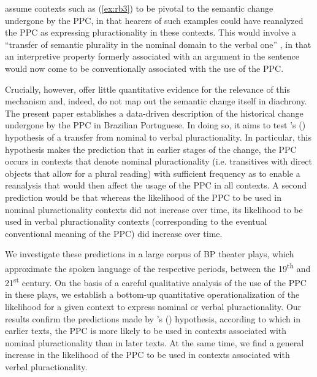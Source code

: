 \documentclass[output=paper,colorlinks,citecolor=brown]{langscibook}
\begin{document}
\citet{AmaralHowe2012} assume contexts such as (\ref{ex:rb3}) to be pivotal to the semantic change undergone by the PPC, in that hearers of such examples could have reanalyzed the PPC as expressing pluractionality in these contexts. This would involve a “transfer of semantic plurality in the nominal domain to the verbal one” \citep[51]{AmaralHowe2012}, in that an interpretive property formerly associated with an argument in the sentence would now come to be conventionally associated with the use of the PPC. 

Crucially, however, \citet{AmaralHowe2012} offer little quantitative evidence for the relevance of this mechanism and, indeed, do not map out the semantic change itself in diachrony. The present paper establishes a data-driven description of the historical change undergone by the PPC in Brazilian Portuguese. In doing so, it aims to test \citeauthor{AmaralHowe2012}’s (\citeyear{AmaralHowe2012}) hypothesis of a transfer from nominal to verbal pluractionality. In particular, this hypothesis makes the prediction that in earlier stages of the change, the PPC occurs in contexts that denote nominal pluractionality (i.e. transitives with direct objects that allow for a plural reading) with sufficient frequency as to enable a reanalysis that would then affect the usage of the PPC in all contexts. A second prediction would be that whereas the likelihood of the PPC to be used in nominal pluractionality contexts did not increase over time, its likelihood to be used in verbal pluractionality contexts (corresponding to the eventual conventional meaning of the PPC) did increase over time. 

We investigate these predictions in a large corpus of BP theater plays, which approximate the spoken language of the respective periods, between the 19\textsuperscript{th} and 21\textsuperscript{st} century. On the basis of a careful qualitative analysis of the use of the PPC in these plays, we establish a bottom-up quantitative operationalization of the likelihood for a given context to express nominal or verbal pluractionality. Our results confirm the predictions made by \citeauthor{AmaralHowe2012}’s (\citeyear{AmaralHowe2012}) hypothesis, according to which in earlier texts, the PPC is more likely to be used in contexts associated with nominal pluractionality than in later texts. At the same time, we find a general increase in the likelihood of the PPC to be used in contexts associated with verbal pluractionality.
\end{document}
